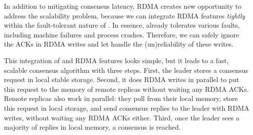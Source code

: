 

% 
In addition to mitigating consensus latency, RDMA creates 
new opportunity to address the \paxos scalability problem, because we
can integrate RDMA features \emph{tightly} within the fault-tolerant nature of 
\paxos. In essence, \paxos already tolerates various faults, including 
machine failures and process crashes. Therefore, we can safely ignore the ACKs 
in RDMA writes and let \paxos handle the (un)reliability of these writes.

This integration of \paxos and RDMA features looks simple, but it leads to 
a fast, scalable \paxos consensus algorithm with three steps. First, the leader 
stores a consensus request in local stable storage. Second, it does RDMA writes 
in parallel to put this request to the memory of remote replicas without 
waiting any RDMA ACKs. Remote replicas also work in parallel: they poll from 
their local memory, store this request in local storage, and send consensus 
replies to the leader with RDMA writes, without waiting any RDMA ACKs 
either. Third, once the leader sees a majority of replies in local memory, 
a consensus is reached.

